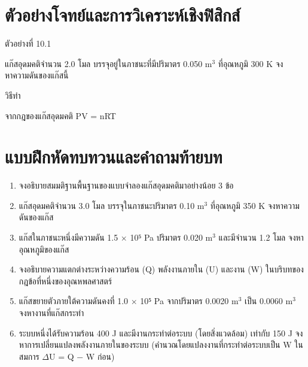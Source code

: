 \section{ตัวอย่างโจทย์และการวิเคราะห์เชิงฟิสิกส์}

\begin{examplebox}
ตัวอย่างที่ 10.1

แก๊สอุดมคติจำนวน 2.0 โมล บรรจุอยู่ในภาชนะที่มีปริมาตร 0.050 m$^3$ ที่อุณหภูมิ 300 K จงหาความดันของแก๊สนี้

วิธีทำ

จากกฎของแก๊สอุดมคติ PV = nRT
\end{examplebox}

\section{แบบฝึกหัดทบทวนและคำถามท้ายบท}

\begin{enumerate}
    \item จงอธิบายสมมติฐานพื้นฐานของแบบจำลองแก๊สอุดมคติมาอย่างน้อย 3 ข้อ
    \item แก๊สอุดมคติจำนวน 3.0 โมล บรรจุในภาชนะปริมาตร 0.10 m$^3$ ที่อุณหภูมิ 350 K จงหาความดันของแก๊ส
    \item แก๊สในภาชนะหนึ่งมีความดัน 1.5 $\times$ 10⁵ Pa ปริมาตร 0.020 m$^3$ และมีจำนวน 1.2 โมล จงหาอุณหภูมิของแก๊ส
    \item จงอธิบายความแตกต่างระหว่างความร้อน (Q) พลังงานภายใน (U) และงาน (W) ในบริบทของกฎข้อที่หนึ่งของอุณหพลศาสตร์
    \item แก๊สขยายตัวภายใต้ความดันคงที่ 1.0 $\times$ 10⁵ Pa จากปริมาตร 0.0020 m$^3$ เป็น 0.0060 m$^3$ จงหางานที่แก๊สกระทำ
    \item ระบบหนึ่งได้รับความร้อน 400 J และมีงานกระทำต่อระบบ (โดยสิ่งแวดล้อม) เท่ากับ 150 J จงหาการเปลี่ยนแปลงพลังงานภายในของระบบ (คำนวณโดยแปลงงานที่กระทำต่อระบบเป็น W ในสมการ $\Delta$U = Q − W ก่อน)
\end{enumerate}


